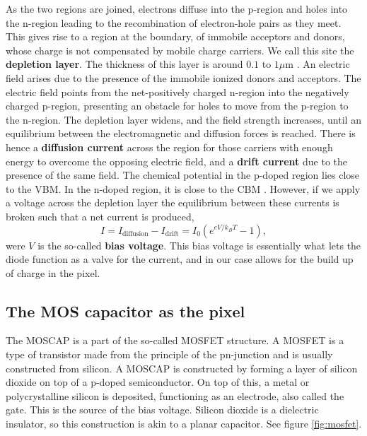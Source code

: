 \documentclass[../main.tex]{subfiles}
\begin{document}
	As the two regions are joined, electrons diffuse into the p-region and holes into the n-region leading to the recombination of electron-hole pairs as they meet. This gives rise to a region at the boundary, of immobile acceptors and donors, whose charge is not compensated by mobile charge carriers. We call this site the \textbf{depletion layer}. The thickness of this layer is around $0.1$ to $1 \mu$m \cite{solidstatephysicsbook}. An electric field arises due to the presence of the immobile ionized donors and acceptors. The electric field points from the net-positively charged n-region into the negatively charged p-region, presenting an obstacle for holes to move from the p-region to the n-region. The depletion layer widens, and the field strength increases, until an equilibrium between the electromagnetic and diffusion forces is reached. There is hence a \textbf{diffusion current} across the region for those carriers with enough energy to overcome the opposing electric field, and a \textbf{drift current} due to the presence of the same field. The chemical potential in the p-doped region lies close to the VBM. In the n-doped region, it is close to the CBM \cite{solidstatephysicsbook} . However, if we apply a voltage across the depletion layer the equilibrium between these currents is broken such that a net current\cite{solidstatephysicsbook} is produced,
	\begin{equation}
		I = I_\text{diffusion} - I_\text{drift} = I_0\left(e^{eV/k_BT}-1\right),
	\end{equation}
	were $V$ is the so-called \textbf{bias voltage}. This bias voltage is essentially what lets the diode function as a valve for the current, and in our case allows for the build up of charge in the pixel.
	
	\subsection{The MOS capacitor as the pixel}
	The MOSCAP is a part of the so-called MOSFET structure. A MOSFET is a type of transistor made from the principle of the pn-junction and is usually constructed from silicon. A MOSCAP is constructed by forming a layer of silicon dioxide on top of a p-doped semiconductor. On top of this, a metal or polycrystalline silicon is deposited, functioning as an electrode, also called the gate. This is the source of the bias voltage. Silicon dioxide is a dielectric insulator, so this construction is akin to a planar capacitor. See figure \ref{fig:mosfet}.
	
\end{document}
